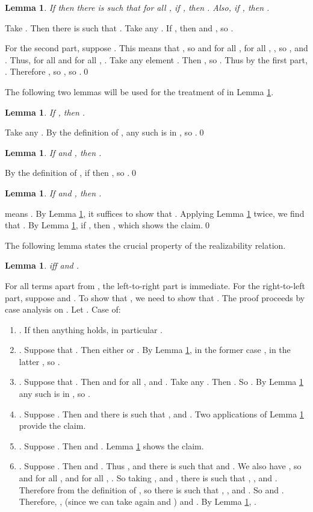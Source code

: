 \documentclass{LMCS}
\newtheorem{lemma}[thm]{Lemma}
\begin{document}
\begin{lemma}\label{ineqrank}
If  then there is  such that
for all , if , then . Also, if , then .
\end{lemma}
\proof Take . Then there is  such that . Take any . If , then  and , so .

For the second part, suppose . 
This means that , so  and for all , for all , , so ,  and . Thus, for all  and for
all , . Take any element . Then , so . Thus by the first part, . 
Therefore , so , so .\qed



The following two lemmas will be used for the treatment of  in Lemma
\ref{realsterms}.

\begin{lemma}\label{realunorderedpair}
If , then .
\end{lemma}
\proof Take any . By the definition of , any such  is in , so .\qed


\begin{lemma}\label{union}
If  and , then .
\end{lemma}
\proof By the definition of , if  then
, so .\qed


\begin{lemma}\label{realsucc}
If  and , then .
\end{lemma}
\proof  means .
By Lemma \ref{ineqrank}, it suffices to show that . Applying Lemma \ref{realunorderedpair}
twice, we find that . By
Lemma \ref{union}, if , then , which
shows the claim.\qed


The following lemma states the crucial property of the realizability relation.
\begin{lemma}\label{realsterms}
 iff  and . 
\end{lemma}
\proof For all terms apart from , the left-to-right part is immediate. For the
right-to-left part, suppose  and . To show that , we need to show that .  The proof proceeds by case analysis
on . Let . Case  of:
\begin{enumerate}[]
\item . If  then anything holds, in particular . 
\item . Suppose that . Then either  or . By Lemma \ref{ineqrank}, in the former case , in the latter , so . 
\item . Suppose that . Then  and for all ,
 and .
Take any . Then . So .
By Lemma \ref{ineqrank} any such  is in , so .
\item . Suppose . Then  and there is  such that ,  and . Two
applications of Lemma \ref{ineqrank} provide the claim. 
\item . Suppose . Then  and . Lemma \ref{ineqrank} shows the claim. 
\item . Suppose . Then  and . Thus ,  and there is  such that  and . We also
have , so  and for all ,  and for all , . So taking , 
and , there is  such that ,
,  and
. Therefore  from the definition of , so 
there is  such that , ,  and . So  and . Therefore, ,  (since we can take again  and ) and . By Lemma \ref{ineqrank}, .
\end{enumerate}
\end{document}
